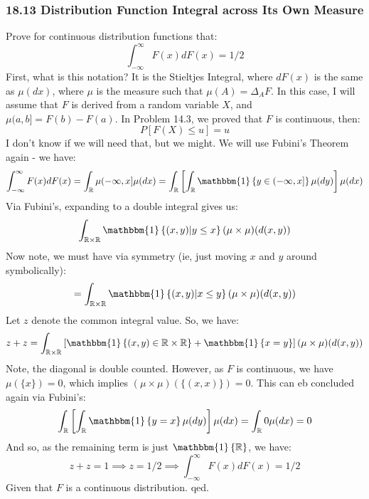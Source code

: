 \documentclass[12pt,a4paper]{article}
\newcommand{\1}[1]{\mathbbm{1}\left\{ #1 \right\}}
\newcommand{\R}{\mathbb{R}}
\begin{document}
\subsubsection{18.13 Distribution Function Integral across Its Own Measure} Prove for continuous distribution functions that:
$$
	\int_{-\infty}^\infty F(x) dF(x) = 1/2
$$
First, what is this notation? It is the Stieltjes Integral, where $dF(x)$ is the same as $\mu(dx)$, where $\mu$ is the measure such that $\mu(A) = \Delta_A F$. In this case, I will assume that $F$ is derived from a random variable $X$, and $\mu(a,b] = F(b) - F(a)$. In Problem 14.3, we proved that $F$ is continuous, then:
$$
	P[F(X) \leq u] = u
$$
I don't know if we will need that, but we might. We will use Fubini's Theorem again - we have:
$$
	\int_{-\infty}^\infty F(x) dF(x) = 
	\int_\R \mu(-\infty,x] \mu(dx) =
	\int_\R \left[\int_\R \1{y \in (-\infty,x]} \mu(dy)\right] \mu(dx)
$$
Via Fubini's, expanding to a double integral gives us:
$$
	\int_{\R \times \R} \1{(x,y) | y \leq x} (\mu \times \mu)(d(x,y))
$$
Now note, we must have via symmetry (ie, just moving $x$ and $y$ around symbolically):
$$
	= \int_{\R \times \R} \1{(x,y) | x \leq y} (\mu \times \mu)(d(x,y))
$$
Let $z$ denote the common integral value. So, we have:
$$
	z + z =
	\int_{\R \times \R} \left[\1{(x, y) \in \R \times \R} +
	\1{x = y}\right] (\mu \times \mu)(d(x,y))
$$
Note, the diagonal is double counted. However, as $F$ is continuous, we have $\mu(\{x\}) = 0$, which implies $(\mu \times \mu)(\{(x,x)\}) = 0$. This can eb concluded again via Fubini's:
$$
	\int_\R \left[\int_\R \1{y = x} \mu(dy)\right] \mu(dx) =
	\int_\R 0 \mu(dx) = 0
$$
And so, as the remaining term is just $\1{\R}$, we have:
$$
	z + z = 1 \implies z = 1/2 \implies
	\int_{-\infty}^\infty F(x) dF(x) = 1/2
$$
Given that $F$ is a continuous distribution. qed.
\end{document}
